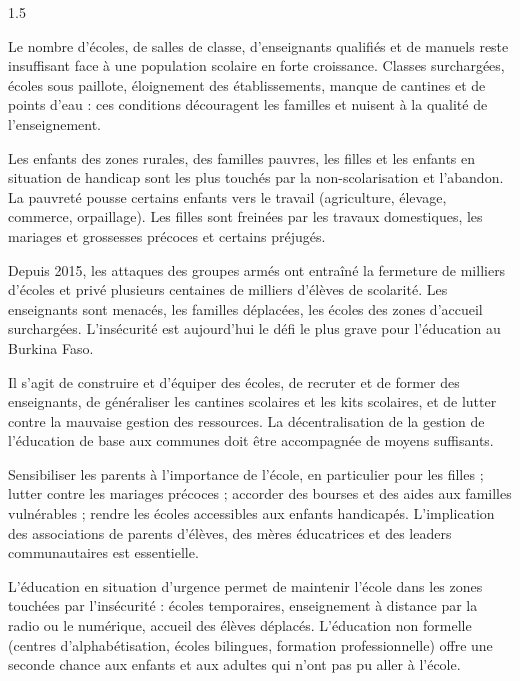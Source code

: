 \documentclass[12pt]{article}
\begin{document}
\begin{spacing}{1.5}

Le nombre d'écoles, de salles de classe, d'enseignants qualifiés et de manuels reste insuffisant face à une population scolaire en forte croissance. Classes surchargées, écoles sous paillote, éloignement des établissements, manque de cantines et de points d'eau : ces conditions découragent les familles et nuisent à la qualité de l'enseignement.

Les enfants des zones rurales, des familles pauvres, les filles et les enfants en situation de handicap sont les plus touchés par la non-scolarisation et l'abandon. La pauvreté pousse certains enfants vers le travail (agriculture, élevage, commerce, orpaillage). Les filles sont freinées par les travaux domestiques, les mariages et grossesses précoces et certains préjugés.

Depuis 2015, les attaques des groupes armés ont entraîné la fermeture de milliers d'écoles et privé plusieurs centaines de milliers d'élèves de scolarité. Les enseignants sont menacés, les familles déplacées, les écoles des zones d'accueil surchargées. L'insécurité est aujourd'hui le défi le plus grave pour l'éducation au Burkina Faso.



Il s'agit de construire et d'équiper des écoles, de recruter et de former des enseignants, de généraliser les cantines scolaires et les kits scolaires, et de lutter contre la mauvaise gestion des ressources. La décentralisation de la gestion de l'éducation de base aux communes doit être accompagnée de moyens suffisants.

Sensibiliser les parents à l'importance de l'école, en particulier pour les filles ; lutter contre les mariages précoces ; accorder des bourses et des aides aux familles vulnérables ; rendre les écoles accessibles aux enfants handicapés. L'implication des associations de parents d'élèves, des mères éducatrices et des leaders communautaires est essentielle.

L'éducation en situation d'urgence permet de maintenir l'école dans les zones touchées par l'insécurité : écoles temporaires, enseignement à distance par la radio ou le numérique, accueil des élèves déplacés. L'éducation non formelle (centres d'alphabétisation, écoles bilingues, formation professionnelle) offre une seconde chance aux enfants et aux adultes qui n'ont pas pu aller à l'école.


\end{spacing}
\end{document}
